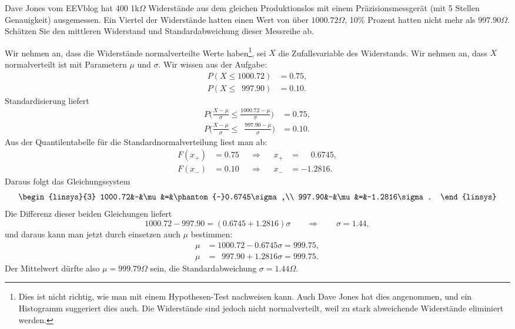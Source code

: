 Dave Jones vom EEVblog hat 400 1k$\Omega$ Widerstände aus dem gleichen
Produktionslos mit einem Präzisionsmessgerät (mit 5 Stellen
Genauigkeit) ausgemessen. 
Ein Viertel der Widerstände hatten einen Wert von über $1000.72\Omega$,
10\% Prozent hatten nicht mehr als $997.90\Omega$.
Schätzen Sie den mittleren Widerstand und Standardabweichung dieser
Messreihe ab.

\begin{loesung}
Wir nehmen an, dass die Widerstände normalverteilte Werte haben\footnote{
Dies ist nicht richtig, wie man mit einem Hypothesen-Test nachweisen kann.
Auch Dave Jones hat dies angenommen, und ein Histogramm suggeriert
dies auch. Die Widerstände sind jedoch nicht normalverteilt, weil zu
stark abweichende Widerstände eliminiert werden.}, sei $X$ die Zufallsvariable
des Widerstands.
Wir nehmen an, dass $X$ normalverteilt ist mit Parametern $\mu$ und $\sigma$.
Wir wissen aus der Aufgabe:
\begin{equation}
\begin{aligned}
P(X\le 1000.72)&=0.75,
\\
P(X\le \phantom{0}997.90)&=0.10.
\end{aligned}
\label{60000042:prob}
\end{equation}
Standardisierung liefert
\begin{equation*}
\begin{aligned}
P\biggl(\frac{X-\mu}{\sigma}\le \frac{1000.72-\mu}{\sigma}\biggr)&=0.75,
\\
P\biggl(\frac{X-\mu}{\sigma}\le \phantom{0}\frac{997.90-\mu}{\sigma}\biggr)&=0.10.
\end{aligned}
\end{equation*}
Aus der Quantilentabelle für die Standardnormalverteilung liest man ab:
\[
\begin{aligned}
F(x_+)&=0.75&&\Rightarrow&&x_+&=\phantom{-}0.6745,\\
F(x_-)&=0.10&&\Rightarrow&&x_-&=-1.2816.
\end{aligned}
\]
Daraus folgt das Gleichungssystem
\[
\begin{linsys}{3}
1000.72&-&\mu&=&\phantom{-}0.6745\sigma,\\
 997.90&-&\mu&=&-1.2816\sigma.
\end{linsys}
\]
Die Differenz dieser beiden Gleichungen liefert
\[
1000.72-997.90 = (0.6745 + 1.2816)\sigma
\qquad
\Rightarrow
\qquad
\sigma = 1.44,
\]
und daraus kann man jetzt durch einsetzen auch $\mu$ bestimmen:
\begin{align*}
\mu&=1000.72-0.6745\sigma=999.75,\\
\mu&=\phantom{0}997.90+1.2816\sigma=999.75.
\end{align*}
Der Mittelwert dürfte also $\mu=999.79\Omega$ sein, die Standardabweichung
$\sigma=1.44\Omega$.
\end{loesung}


